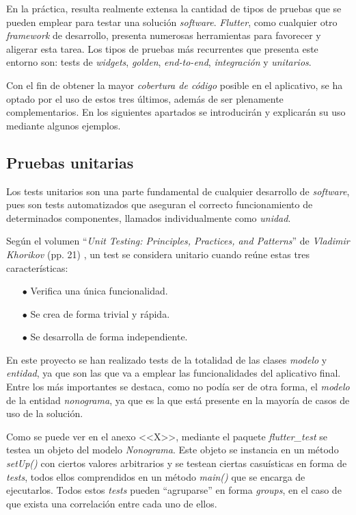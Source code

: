  En la práctica, resulta realmente extensa la cantidad de tipos de pruebas que se pueden emplear para testar una
 solución \textit{software}. \textit{Flutter}, como cualquier otro \textit{framework} de desarrollo, presenta
 numerosas herramientas para favorecer y aligerar esta tarea. Los tipos de pruebas más recurrentes que presenta este entorno
 son: tests de \textit{widgets}, \textit{golden}, \textit{end-to-end}, 
 \textit{integración} y \textit{unitarios}.
 
 Con el fin de obtener la mayor \textit{cobertura de código} posible en el aplicativo, se ha optado por el uso de estos
 tres últimos, además de ser plenamente complementarios. En los siguientes apartados se introducirán y explicarán su uso mediante algunos ejemplos.

 \subsection{Pruebas unitarias}
 Los tests unitarios son una parte fundamental de cualquier desarrollo
 de \textit{software}, pues son tests automatizados que aseguran el correcto
 funcionamiento de determinados componentes, llamados individualmente como \textit{unidad}.

 Según el volumen ``\textit{Unit Testing: Principles, Practices, and Patterns}'' de \textit{Vladimir Khorikov} (pp. 21) \cite{khorikov2020unit}, un test se considera unitario cuando reúne estas tres características:
 \begin{itemize}
     \item[$\bullet$] Verifica una única funcionalidad.
     \item[$\bullet$] Se crea de forma trivial y rápida.
     \item[$\bullet$] Se desarrolla de forma independiente.
 \end{itemize}

 En este proyecto se han realizado tests de la totalidad de las clases \textit{modelo} y \textit{entidad}, ya que
 son las que va a emplear las funcionalidades del aplicativo final. Entre los más importantes se destaca, como
 no podía ser de otra forma, el \textit{modelo} de la entidad
 \textit{nonograma}, ya que es la que está presente en la mayoría de casos de uso de la solución.

 Como se puede ver en el anexo <<X>>, mediante el paquete \textit{flutter\_test} se testea un objeto del
 modelo \textit{Nonograma}. Este objeto se instancia en un método \textit{setUp()} con ciertos valores 
 arbitrarios y se testean ciertas casuísticas en forma de \textit{tests}, 
 todos ellos comprendidos en un método \textit{main()}
 que se encarga de ejecutarlos.
 Todos estos \textit{tests} pueden ``agruparse'' en forma \textit{groups}, en el caso de que exista una correlación
 entre cada uno de ellos.

